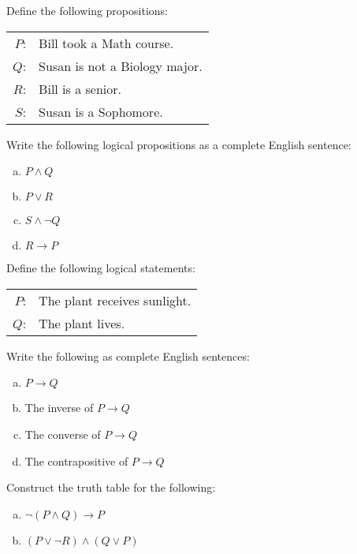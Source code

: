 \documentclass[11pt,letterpaper]{article}
\begin{document}

 Define the following propositions:
	\begin{table}[H]
	\centering
	\begin{tabular}{rl}
	$P$: & Bill took a Math course. \\
	$Q$: & Susan is not a Biology major. \\
	$R$: & Bill is a senior. \\
	$S$: & Susan is a Sophomore. 
	\end{tabular}
	\end{table}
Write the following logical propositions as a complete English sentence:
	\begin{enumerate}[(a)]
	\item $P \wedge Q$
	\item $P \vee R$
	\item $S \wedge \neg Q$
	\item $R \to P$
	\end{enumerate}



\newpage



 Define the following logical statements:
	\begin{table}[H]
	\centering
	\begin{tabular}{rl}
	$P$: & The plant receives sunlight. \\
	$Q$: & The plant lives. 
	\end{tabular}
	\end{table}
Write the following as complete English sentences: 
	\begin{enumerate}[(a)]
	\item $P \to Q$
	\item The inverse of $P \to Q$
	\item The converse of $P \to Q$
	\item The contrapositive of $P \to Q$
	\end{enumerate}



\newpage



 Construct the truth table for the following:
	\begin{enumerate}[(a)]
	\item $\neg (P \wedge Q) \to P$
	\item $(P \vee \neg R) \wedge (Q \vee P)$
	\end{enumerate} 
\end{document}
